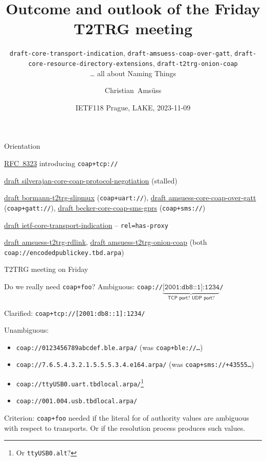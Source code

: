 \documentclass[aspectratio=169,colorlinks]{beamer}
\title{Outcome and outlook of the Friday T2TRG meeting}
\subtitle[]{
  \texttt{draft-core-transport-indication},
  \texttt{draft-amsuess-coap-over-gatt},
  \texttt{draft-core-resource-directory-extensions},
  \texttt{draft-t2trg-onion-coap}\\
  … all about Naming Things
}
\author{Christian~Amsüss}
\date{IETF118 Prague, LAKE, 2023-11-09}
\newcommand{\rfc}[1]{\href{https://datatracker.ietf.org/doc/html/rfc#1}{RFC~#1}}
\newcommand{\ietfdraft}[1]{\href{https://datatracker.ietf.org/doc/draft-#1/}{draft #1}}
\begin{document}
\frame{\titlepage}

\begin{frame}{Orientation}\large
  \begin{description}
    \item[Origin:] \rfc{8323} introducing \texttt{coap+tcp://}
    \item[led to:] \ietfdraft{silverajan-core-coap-protocol-negotiation} (stalled)
    \item[used by:] {\footnotesize \ietfdraft{bormann-t2trg-slipmux} (\texttt{coap+uart://}), \ietfdraft{amsuess-core-coap-over-gatt} (\texttt{coap+gatt://}), \ietfdraft{becker-core-coap-sms-gprs} (\texttt{coap+sms://})}
    \item[reboot:] \ietfdraft{ietf-core-transport-indication} -- \texttt{rel=has-proxy}
    \item[more users:] \ietfdraft{amsuess-t2trg-rdlink}, \ietfdraft{amsuess-t2trg-onion-coap} (both \texttt{coap://encodedpublickey.tbd.arpa})

      \bigskip

    \item T2TRG meeting on Friday
  \end{description}
\end{frame}

\begin{frame}{Do we really need \texttt{coap+foo}?}\large
  Ambiguous: \texttt{coap://$\underbrace{\texttt{[2001:db8::1]:1234}}_{\textsf{TCP port? UDP port?}}$/}

  Clarified: \texttt{coap+tcp://[2001:db8::1]:1234/}

  \bigskip

  Unambiguous:
  \begin{itemize}
    \item \texttt{coap://0123456789abcdef.ble.arpa/} (was \texttt{coap+ble://\ldots})
    \item \texttt{coap://7.6.5.4.3.2.1.5.5.5.3.4.e164.arpa/} (was \texttt{coap+sms://+43555\ldots})
    \item \texttt{coap://ttyUSB0.uart.tbdlocal.arpa/}\footnote{Or \texttt{ttyUSB0.alt}?} %
    \item \texttt{coap://001.004.usb.tbdlocal.arpa/}
  \end{itemize}

  \bigskip

  Criterion: \texttt{coap+foo} needed if the literal for of authority values are ambiguous with respect to transports. Or if the resolution process produces such values.
\end{frame}
\end{document}
